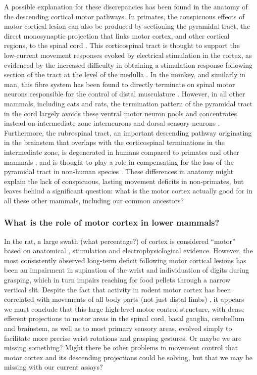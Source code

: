 A possible explanation for these discrepancies has been found in the anatomy of the descending cortical motor pathways. In primates, the conspicuous effects of motor cortical lesion can also be produced by sectioning the pyramidal tract, the direct monosynaptic projection that links motor cortex, and other cortical regions, to the spinal cord \cite{Tower1940,Lawrence1968}. This corticospinal tract is thought to support the low-current movement responses evoked by electrical stimulation in the cortex, as evidenced by the increased difficulty in obtaining a stimulation response following section of the tract at the level of the medulla \cite{Woolsey1972}. In the monkey, and similarly in man, this fibre system has been found to directly terminate on spinal motor neurons responsible for the control of distal musculature \cite{Leyton1917,Bernhard1954}. However, in all other mammals, including cats and rats, the termination pattern of the pyramidal tract in the cord largely avoids these ventral motor neuron pools and concentrates instead on intermediate zone interneurons and dorsal sensory neurons \cite{Kuypers1981,Yang2003}. Furthermore, the rubrospinal tract, an important descending pathway originating in the brainstem that overlaps with the corticospinal terminations in the intermediate zone, is degenerated in humans compared to primates and other mammals \cite{Square1982}, and is thought to play a role in compensating for the loss of the pyramidal tract in non-human species \cite{Lawrence1968a,Zaaimi2012}. These differences in anatomy might explain the lack of conspicuous, lasting movement deficits in non-primates, but leaves behind a significant question: what is the motor cortex actually good for in all these other mammals, including our common ancestors?

\subsubsection*{What is the role of motor cortex in lower mammals?}

In the rat, a large swath (what percentage?) of cortex is considered ``motor'' based on anatomical \cite{Donoghue1982}, stimulation \cite{Donoghue1982,Neafsey1986} and electrophysiological evidence. However, the most consistently observed long-term deficit following motor cortical lesions has been an impairment in supination of the wrist and individuation of digits during grasping, which in turn impairs reaching for food pellets through a narrow vertical slit. Despite the fact that activity in rodent motor cortex has been correlated with movements of all body parts (not just distal limbs) \cite{Hill2011,Erlich2011}, it appears we must conclude that this large high-level motor control structure, with dense efferent projections to motor areas in the spinal cord, basal ganglia, cerebellum and brainstem, as well as to most primary sensory areas, evolved simply to facilitate more precise wrist rotations and grasping gestures. Or maybe we are missing something? Might there be other problems in movement control that motor cortex and its descending projections could be solving, but that we may be missing with our current assays?

